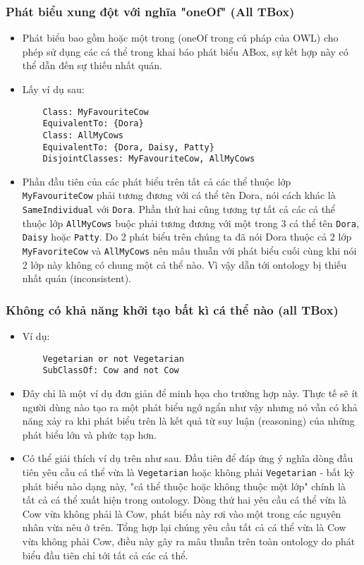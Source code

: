 \subsubsection{Phát biểu xung đột với nghĩa "oneOf" (All TBox)}

\begin{itemize}
	\item 
	Phát biểu bao gồm hoặc một trong (oneOf trong cú pháp của OWL) cho phép sử dụng các cá thể trong khai báo phát biểu ABox, sự kết hợp này có thể dẫn đến sự thiếu nhất quán.
	\item
	Lấy ví dụ sau:
	\begin{verbatim}
	Class: MyFavouriteCow
	EquivalentTo: {Dora}
	Class: AllMyCows
	EquivalentTo: {Dora, Daisy, Patty}
	DisjointClasses: MyFavouriteCow, AllMyCows
	\end{verbatim}
	\item
	Phần đầu tiên của các phát biểu trên tất cả các thể thuộc lớp \texttt{MyFavouriteCow} phải tương đương với cá thể tên Dora, nói cách khác là \texttt{SameIndividual} với \texttt{Dora}. Phần thứ hai cũng  tương tự tất cả các cá thể thuộc lớp \texttt{AllMyCows} buộc phải tương đương với một trong 3 cá thể tên \texttt{Dora}, \texttt{Daisy} hoặc \texttt{Patty}. Do 2 phát biểu trên chúng ta đã nói Dora thuộc cả 2 lớp \texttt{MyFavoriteCow} và \texttt{AllMyCows} nên mâu thuẫn với phát biểu cuối cùng khi nói 2 lớp này không có chung một cá thể nào. Vì vậy dẫn tới ontology bị thiếu nhất quán (inconsistent).
\end{itemize}
\subsubsection{Không có khả năng khởi tạo bất kì cá thể nào (all TBox)}
\begin{itemize}
	\item Ví dụ:
	\begin{verbatim}
	Vegetarian or not Vegetarian
	SubClassOf: Cow and not Cow
	\end{verbatim}
	\item
	Đây chỉ là một ví dụ đơn giản để minh họa cho trường hợp này. Thực tế sẽ ít người dùng nào tạo ra một phát biểu ngớ ngẩn như vậy nhưng nó vẫn có khả năng xảy ra khi phát biểu trên là kết quả từ suy luận (reasoning) của những phát biểu lớn và phức tạp hơn.
	\item
	Có thể giải thích ví dụ trên như sau. Đầu tiên để đáp ứng ý nghĩa dòng đầu tiên yêu cầu cá thể vừa là \texttt{Vegetarian} hoặc không phải \texttt{Vegetarian} - bất kỳ phát biểu nào dạng này, "cá thể thuộc hoặc không thuộc một lớp" chính là tất cả cá thể xuất hiện trong ontology. Dòng thứ hai yêu cầu cá thể vừa là Cow vừa không phải là Cow, phát biểu này rơi vào một trong các nguyên nhân vừa nêu ở trên. Tổng hợp lại chúng yêu cầu tất cả cá thể vừa là Cow vừa không phải Cow, điều này gây ra mâu thuẫn trên toàn ontology do phát biểu đầu tiên chỉ tới tất cả các cá thể.
\end{itemize}

